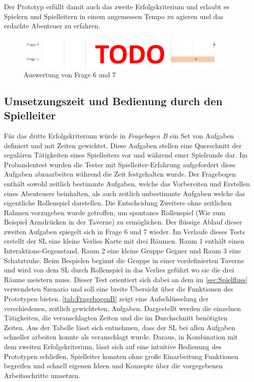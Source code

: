 Der Prototyp erfüllt damit auch das zweite Erfolgskriterium und erlaubt es Spielern und Spielleitern in einem angemessen Tempo zu agieren und das erdachte Abenteuer zu erfahren.

\begin{figure}
	\centering
		\includegraphics[width=1.00\textwidth]{media/2questions_temp.png}
	\caption{Auswertung von Frage 6 und 7}
	\label{fig:questions_6_7}
\end{figure}


\subsection{Umsetzungszeit und Bedienung durch den Spielleiter}
\label{sec:UmsetzungszeitUndBedienungDurchDenSpielleiter}
Für das dritte Erfolgskriterium würde in \emph{Fragebogen B} ein Set von Aufgaben definiert und mit Zeiten gewichtet. Diese Aufgaben stellen eine Querschnitt der regulären Tätigkeiten eines Spielleiters vor und während einer Spielrunde dar. Im Probandentest wurden die Tester mit Spielleiter-Erfahrung aufgefordert diese Aufgaben abzuarbeiten während die Zeit festgehalten wurde. Der Fragebogen enthält sowohl zeitlich bestimmte Aufgaben, welche das Vorbereiten und Erstellen eines Abenteuers beinhalten, als auch zeitlich unbestimmte Aufgaben welche das eigentliche Rollenspiel darstellen. Die Entscheidung Zweitere ohne zeitlichen Rahmen vorzugeben wurde getroffen, um spontanes Rollenspiel (Wie zum Beispiel Armdrücken in der Taverne) zu ermöglichen. Der flüssige Ablauf dieser zweiten Aufgaben spiegelt sich in Frage 6 und 7 wieder. Im Verlaufe dieses Tests erstellt der SL eine kleine Verlies Karte mit drei Räumen. Raum 1 enthält einen Interaktions-Gegenstand, Raum 2 eine kleine Gruppe Gegner und Raum 3 eine Schatztruhe.\newline
Beim Bespielen beginnt die Gruppe in einer vordefinierten Taverne und wird von dem SL durch Rollenspiel in das Verlies geführt wo sie die drei Räume meistern muss. Dieser Test orientiert sich dabei an dem im \ref{sec:Spielfluss} verwendeten Szenario und soll eine breite Übersicht über die Funktionen des Prototypen bieten.\newline
\ref{tab:FragebogenB} zeigt eine Aufschlüsselung der verschiedenen, zeitlich gewichteten, Aufgaben. Dargestellt werden die einzelnen Tätigkeiten, die veranschlagten Zeiten und die im Durchschnitt benötigten Zeiten. Aus der Tabelle lässt sich entnehmen, dass der SL bei allen Aufgaben schneller arbeiten konnte als veranschlagt wurde. Daraus, in Kombination mit dem zweiten Erfolgskriterium, lässt sich auf eine intuitive Bedienung des Prototypen schließen. Spielleiter konnten ohne große Einarbeitung Funktionen begreifen und schnell eigenen Ideen und Konzepte über die vorgegebenen Arbeitsschritte umsetzen. 
